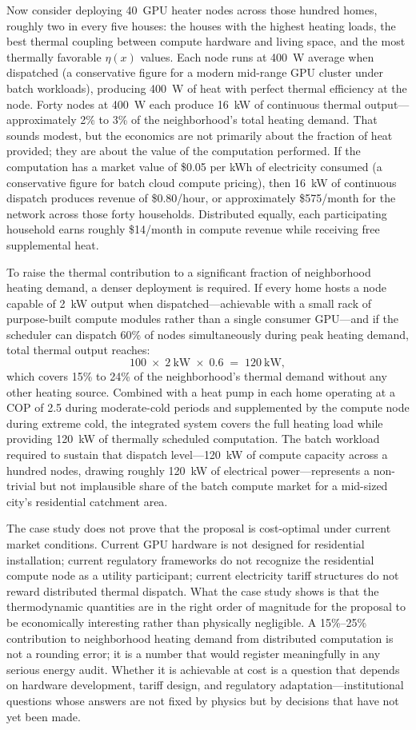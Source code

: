 \documentclass[12pt, oneside]{article}
\begin{document}
Now consider deploying 40~GPU heater nodes across those hundred homes, roughly two in every five houses: the houses with the highest heating loads, the best thermal coupling between compute hardware and living space, and the most thermally favorable $\eta(x)$ values. Each node runs at 400~W average when dispatched (a conservative figure for a modern mid-range GPU cluster under batch workloads), producing 400~W of heat with perfect thermal efficiency at the node. Forty nodes at 400~W each produce 16~kW of continuous thermal output---approximately 2\% to 3\% of the neighborhood's total heating demand. That sounds modest, but the economics are not primarily about the fraction of heat provided; they are about the value of the computation performed. If the computation has a market value of \$0.05 per kWh of electricity consumed (a conservative figure for batch cloud compute pricing), then 16~kW of continuous dispatch produces revenue of \$0.80/hour, or approximately \$575/month for the network across those forty households. Distributed equally, each participating household earns roughly \$14/month in compute revenue while receiving free supplemental heat.

To raise the thermal contribution to a significant fraction of neighborhood heating demand, a denser deployment is required. If every home hosts a node capable of 2~kW output when dispatched---achievable with a small rack of purpose-built compute modules rather than a single consumer GPU---and if the scheduler can dispatch 60\% of nodes simultaneously during peak heating demand, total thermal output reaches:
\[
100 \;\times\; 2~\text{kW} \;\times\; 0.6 \;=\; 120~\text{kW},
\]
which covers 15\% to 24\% of the neighborhood's thermal demand without any other heating source. Combined with a heat pump in each home operating at a COP of 2.5 during moderate-cold periods and supplemented by the compute node during extreme cold, the integrated system covers the full heating load while providing 120~kW of thermally scheduled computation. The batch workload required to sustain that dispatch level---120~kW of compute capacity across a hundred nodes, drawing roughly 120~kW of electrical power---represents a non-trivial but not implausible share of the batch compute market for a mid-sized city's residential catchment area.

The case study does not prove that the proposal is cost-optimal under current market conditions. Current GPU hardware is not designed for residential installation; current regulatory frameworks do not recognize the residential compute node as a utility participant; current electricity tariff structures do not reward distributed thermal dispatch. What the case study shows is that the thermodynamic quantities are in the right order of magnitude for the proposal to be economically interesting rather than physically negligible. A 15\%--25\% contribution to neighborhood heating demand from distributed computation is not a rounding error; it is a number that would register meaningfully in any serious energy audit. Whether it is achievable at cost is a question that depends on hardware development, tariff design, and regulatory adaptation---institutional questions whose answers are not fixed by physics but by decisions that have not yet been made.
\end{document}
